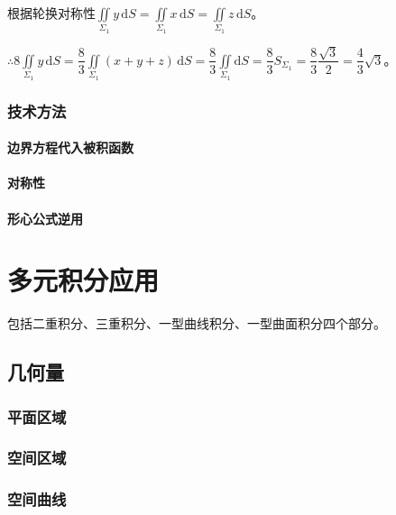 \documentclass[UTF8, 12pt]{ctexart}
\begin{document}
根据轮换对称性$\iint\limits_{\Sigma_1}y\,\textrm{d}S=\iint\limits_{\Sigma_1}x\,\textrm{d}S=\iint\limits_{\Sigma_1}z\,\textrm{d}S$。

$\therefore8\iint\limits_{\Sigma_1}y\,\textrm{d}S=\dfrac{8}{3}\iint\limits_{\Sigma_1}(x+y+z)\,\textrm{d}S=\dfrac{8}{3}\iint\limits_{\Sigma_1}\textrm{d}S=\dfrac{8}{3}S_{\Sigma_1}=\dfrac{8}{3}\dfrac{\sqrt{3}}{2}=\dfrac{4}{3}\sqrt{3}$。

\subsubsection{技术方法}

\paragraph{边界方程代入被积函数} \leavevmode \medskip

\paragraph{对称性} \leavevmode \medskip

\paragraph{形心公式逆用} \leavevmode \medskip

\section{多元积分应用}

包括二重积分、三重积分、一型曲线积分、一型曲面积分四个部分。

\subsection{几何量}

\subsubsection{平面区域}

\subsubsection{空间区域}

\subsubsection{空间曲线}
\end{document}
